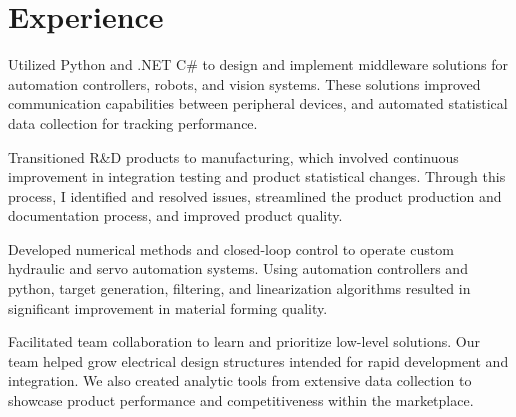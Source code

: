 \documentclass[]{TTurner}
\begin{document}

\begin{minipage}[t]{0.7\textwidth} 

\section{Experience}
\vspace{\topsep}
\begin{tightemize}
\sectionsep
\item Utilized Python and .NET C\# to design and implement middleware solutions for automation controllers, robots, and vision systems. These solutions improved communication capabilities between peripheral devices, and automated statistical data collection for tracking performance.
\item Transitioned R\&D products to manufacturing, which involved continuous improvement in integration testing and product statistical changes. Through this process, I identified and resolved issues, streamlined the product production and documentation process, and improved product quality. 
\end{tightemize}
\sectionsep

\begin{tightemize}
\sectionsep
\item Developed numerical methods and closed-loop control to operate custom hydraulic and servo automation systems. Using automation controllers and python, target generation, filtering, and linearization algorithms resulted in significant improvement in material forming quality.
\item Facilitated team collaboration to learn and prioritize low-level solutions. Our team helped grow electrical design structures intended for rapid development and integration. We also created analytic tools from extensive data collection to showcase product performance and competitiveness within the marketplace. 
\end{tightemize}
\sectionsep


\end{minipage}
\end{document}
